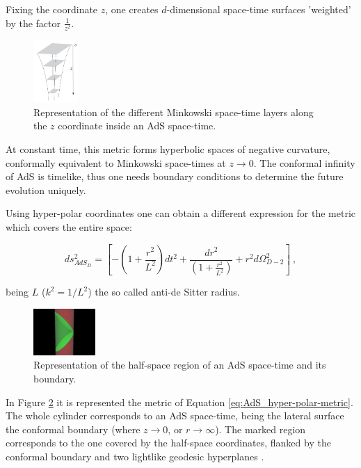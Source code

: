 \documentclass[lettersize,journal]{IEEEtran}
\providecommand{\eq}[2]{
    \begin{equation}
        #2
    \label{eq:#1}
    \end{equation}
}
\begin{document}
Fixing the coordinate $z$, one creates $d$-dimensional space-time surfaces 'weighted' by the factor $\frac{1}{z^2}$.

\begin{figure}
    \centering
    \includegraphics[width=0.15\textwidth]{../Imatges/Extern/Captura_Superficies_z.png}
\caption{Representation of the different Minkowski space-time layers along the $z$ coordinate inside an AdS space-time.}
\label{fig:AdS_z-surfaces}
\end{figure}

At constant time, \cite{} this metric forms hyperbolic spaces of negative curvature, conformally equivalent to Minkowski space-times at $z \to 0$. The conformal infinity of AdS is timelike, thus one needs boundary conditions to determine the future evolution uniquely.

Using hyper-polar coordinates one can obtain a different expression for the metric which covers the entire space:
\eq{AdS_hyper-polar-metric}{
    ds_{AdS_D}^2 = \left [ - \left ( 1 + \frac{r^2}{L^2} \right ) dt^2 + \frac{dr^2}{\left ( 1+ \frac{r^2}{L^2} \right )} + r^2 d \Omega_{D-2}^2 \right ] \ ,
}
being $L$ ($k^2=1/L^2$) the so called anti-de Sitter radius.

\begin{figure}
    \centering
    \includegraphics[width=0.21\textwidth]{../Imatges/Extern/Wikipedia_Half-space_Cilindric.png}
\caption{Representation of the half-space region of an AdS space-time and its boundary.}
\label{fig:AdS_cylindrical}
\end{figure}

In Figure \ref{fig:AdS_cylindrical} it is represented the metric of Equation \ref{eq:AdS_hyper-polar-metric}. The whole cylinder corresponds to an AdS space-time, being the lateral surface the conformal boundary (where $z \to 0$, or $r \to \infty$). The marked region corresponds to the one covered by the half-space coordinates, flanked by the conformal boundary and two lightlike geodesic hyperplanes \cite{}.
\end{document}
